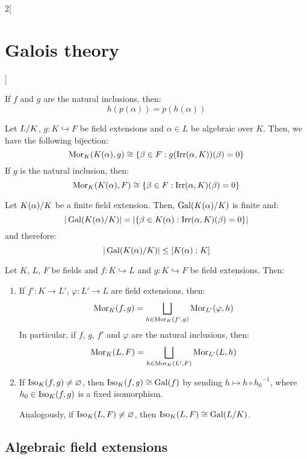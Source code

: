 \documentclass[../../../main.tex]{subfiles}
\begin{document}
\begin{multicols}{2}[\section{Galois theory}]
\begin{lemma}
    If $f$ and $g$ are the natural inclusions, then: $$h(p(\alpha))=p(h(\alpha))$$
  \end{lemma}
  \begin{lemma}
    Let $\quot{L}{K}$, $g:K \hookrightarrow F$ be field extensions and $\alpha\in L$ be algebraic over $K$. Then, we have the following bijection: $$\operatorname{Mor}_K(K(\alpha),g)\cong\{\beta\in F:g(\operatorname{Irr}(\alpha,K))(\beta)=0\}$$
    If $g$ is the natural inclusion, then: $$\operatorname{Mor}_K(K(\alpha),F)\cong\{\beta\in F:\operatorname{Irr}(\alpha,K)(\beta)=0\}$$
  \end{lemma}
  \begin{corollary}
    Let $\quot{K(\alpha)}{K}$ be a finite field extension. Then, $\Gal(\quot{K(\alpha)}{K})$ is finite and:
    $$\textstyle|\Gal(\quot{K(\alpha)}{K})|=|\{\beta\in K(\alpha):\irr(\alpha,K)(\beta)=0\}|$$
    and therefore: $$\textstyle|\Gal(\quot{K(\alpha)}{K})|\leq[K(\alpha):K]$$
  \end{corollary}
  \begin{prop}
    Let $K$, $L$, $F$ be fields and $f:K\hookrightarrow L$ and $g:K\hookrightarrow F$ be field extensions. Then:
    \begin{enumerate}
      \item If $f':K\rightarrow L'$, $\varphi:L'\rightarrow L$ are field extensions, then: $$\operatorname{Mor}_K(f,g)=\bigsqcup_{h\in\operatorname{Mor}_K(f',g)}\operatorname{Mor}_{L'}(\varphi,h)$$
            In particular, if $f$, $g$, $f'$ and $\varphi$ are the natural inclusions, then:
            $$\operatorname{Mor}_K(L,F)=\bigsqcup_{h\in\operatorname{Mor}_K(L',F)}\operatorname{Mor}_{L'}(L,h)$$
      \item If $\operatorname{Iso}_K(f,g)\ne\varnothing$, then $\operatorname{Iso}_K(f,g)\cong\operatorname{Gal}(f)$ by sending $h\mapsto h\circ {h_0}^{-1}$, where $h_0\in\operatorname{Iso}_K(f,g)$ is a fixed isomorphism.

            Analogously, if $\operatorname{Iso}_K(L,F)\ne\varnothing$, then $\Iso_K(L,F)\cong\Gal(\quot{L}{K})$.
    \end{enumerate}
  \end{prop}
  \subsection{Algebraic field extensions}

\end{multicols}
\end{document}
